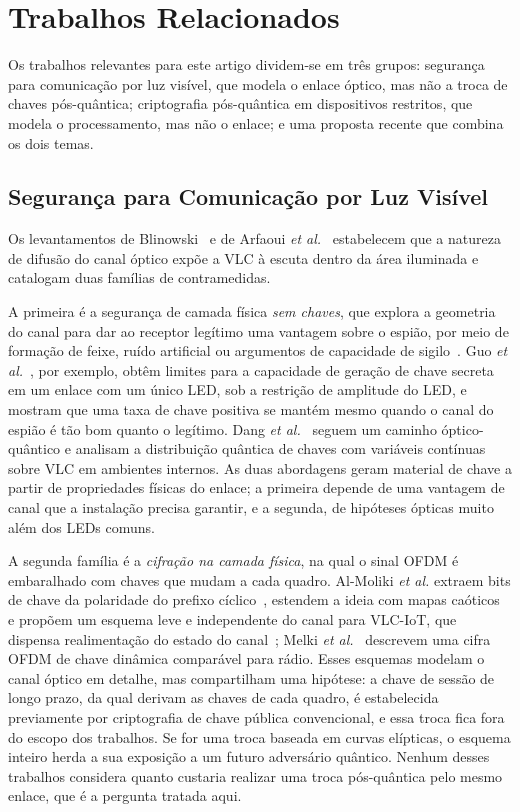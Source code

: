 \section{Trabalhos Relacionados}\label{sec:related}
Os trabalhos relevantes para este artigo dividem-se em três grupos: segurança
para comunicação por luz visível, que modela o enlace óptico, mas não a troca
de chaves pós-quântica; criptografia pós-quântica em dispositivos restritos,
que modela o processamento, mas não o enlace; e uma proposta recente que
combina os dois temas.

\subsection{Segurança para Comunicação por Luz Visível}
Os levantamentos de Blinowski~\cite{blinowski2019vlcsec} e de Arfaoui
\emph{et al.}~\cite{arfaoui2020plsvlc} estabelecem que a natureza de difusão do
canal óptico expõe a VLC à escuta dentro da área iluminada e catalogam duas
famílias de contramedidas.

A primeira é a segurança de camada física \emph{sem chaves}, que explora a
geometria do canal para dar ao receptor legítimo uma vantagem sobre o espião,
por meio de formação de feixe, ruído artificial ou argumentos de capacidade de
sigilo~\cite{arfaoui2020plsvlc}. Guo \emph{et al.}~\cite{guo2025skavlc}, por
exemplo, obtêm limites para a capacidade de geração de chave secreta em um
enlace com um único LED, sob a restrição de amplitude do LED, e mostram que uma
taxa de chave positiva se mantém mesmo quando o canal do espião é tão bom
quanto o legítimo. Dang \emph{et al.}~\cite{dang2020qkdvlc} seguem um caminho
óptico-quântico e analisam a distribuição quântica de chaves com variáveis
contínuas sobre VLC em ambientes internos. As duas abordagens geram material de
chave a partir de propriedades físicas do enlace; a primeira depende de uma
vantagem de canal que a instalação precisa garantir, e a segunda, de hipóteses
ópticas muito além dos LEDs comuns.

A segunda família é a \emph{cifração na camada física}, na qual o sinal OFDM é
embaralhado com chaves que mudam a cada quadro. Al-Moliki \emph{et al.} extraem
bits de chave da polaridade do prefixo cíclico~\cite{almoliki2016keygen},
estendem a ideia com mapas caóticos~\cite{almoliki2019chaos} e propõem um
esquema leve e independente do canal para VLC-IoT, que dispensa realimentação
do estado do canal~\cite{almoliki2022lci}; Melki
\emph{et al.}~\cite{melki2019dynamic} descrevem uma cifra OFDM de chave
dinâmica comparável para rádio. Esses esquemas modelam o canal óptico em
detalhe, mas compartilham uma hipótese: a chave de sessão de longo prazo, da
qual derivam as chaves de cada quadro, é estabelecida previamente por
criptografia de chave pública convencional, e essa troca fica fora do escopo
dos trabalhos. Se for uma troca baseada em curvas elípticas, o esquema inteiro
herda a sua exposição a um futuro adversário quântico. Nenhum desses trabalhos
considera quanto custaria realizar uma troca pós-quântica pelo mesmo enlace,
que é a pergunta tratada aqui.

